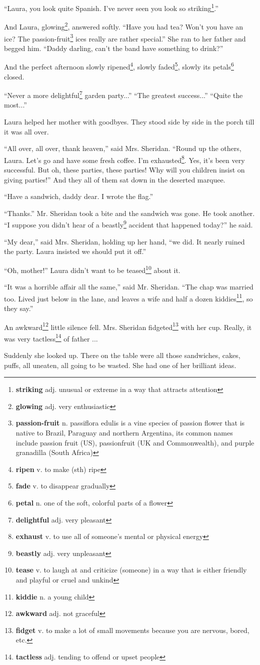 ``Laura, you look quite Spanish. I've never seen you look so striking\footnote{\textbf{striking} adj. unusual or extreme in a way that attracts attention}.''

And Laura, glowing\footnote{\textbf{glowing} adj. very enthusiastic}, answered softly. ``Have you had tea? Won't you have an ice? The passion-fruit\footnote{\textbf{passion-fruit} n. passiflora edulis is a vine species of passion flower that is native to Brazil, Paraguay and northern Argentina, its common names include passion fruit (US), passionfruit (UK and Commonwealth), and purple granadilla (South Africa)} ices really are rather special.'' She ran to her father and begged him. ``Daddy darling, can't the band have something to drink?''

And the perfect afternoon slowly ripened\footnote{\textbf{ripen} v. to make (sth) ripe}, slowly faded\footnote{\textbf{fade} v. to disappear gradually}, slowly its petals\footnote{\textbf{petal} n. one of the soft, colorful parts of a flower} closed.

``Never a more delightful\footnote{\textbf{delightful} adj. very pleasant} garden party...'' ``The greatest success...'' ``Quite the most...''

Laura helped her mother with goodbyes. They stood side by side in the porch till it was all over.

``All over, all over, thank heaven,'' said Mrs. Sheridan. ``Round up the others, Laura. Let's go and have some fresh coffee. I'm exhausted\footnote{\textbf{exhaust} v. to use all of someone's mental or physical energy}. Yes, it's been very successful. But oh, these parties, these parties! Why will you children insist on giving parties!'' And they all of them sat down in the deserted marquee.

``Have a sandwich, daddy dear. I wrote the flag.''

``Thanks.'' Mr. Sheridan took a bite and the sandwich was gone. He took another. ``I suppose you didn't hear of a beastly\footnote{\textbf{beastly} adj. very unpleasant} accident that happened today?'' he said.

``My dear,'' said Mrs. Sheridan, holding up her hand, ``we did. It nearly ruined the party. Laura insisted we should put it off.''

``Oh, mother!'' Laura didn't want to be teased\footnote{\textbf{tease} v. to laugh at and criticize (someone) in a way that is either friendly and playful or cruel and unkind} about it.

``It was a horrible affair all the same,'' said Mr. Sheridan. ``The chap was married too. Lived just below in the lane, and leaves a wife and half a dozen kiddies\footnote{\textbf{kiddie} n. a young child}, so they say.''

An awkward\footnote{\textbf{awkward} adj. not graceful} little silence fell. Mrs. Sheridan fidgeted\footnote{\textbf{fidget} v. to make a lot of small movements because you are nervous, bored, etc.} with her cup. Really, it was very tactless\footnote{\textbf{tactless} adj. tending to offend or upset people} of father ...

Suddenly she looked up. There on the table were all those sandwiches, cakes, puffs, all uneaten, all going to be wasted. She had one of her brilliant ideas.
